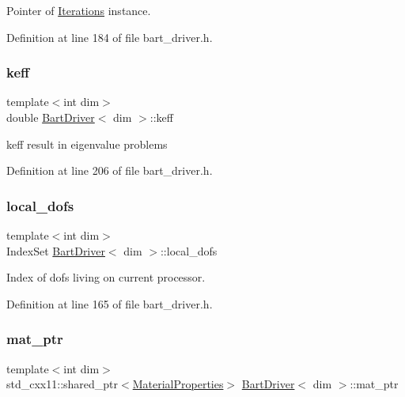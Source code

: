 Pointer of \hyperlink{class_iterations}{Iterations} instance. 



Definition at line 184 of file bart\+\_\+driver.\+h.

\mbox{\label{class_bart_driver_a459fab858171aa05e4618d6d9d327e87}} 
\subsubsection{\texorpdfstring{keff}{keff}}
{\footnotesize\ttfamily template$<$int dim$>$ \\
double \hyperlink{class_bart_driver}{Bart\+Driver}$<$ dim $>$\+::keff\hspace{0.3cm}{\ttfamily [private]}}



keff result in eigenvalue problems 



Definition at line 206 of file bart\+\_\+driver.\+h.

\mbox{\label{class_bart_driver_a06a4f83c6f9bea928ec311fcdf974ab1}} 
\subsubsection{\texorpdfstring{local\+\_\+dofs}{local\_dofs}}
{\footnotesize\ttfamily template$<$int dim$>$ \\
Index\+Set \hyperlink{class_bart_driver}{Bart\+Driver}$<$ dim $>$\+::local\+\_\+dofs\hspace{0.3cm}{\ttfamily [private]}}



Index of dofs living on current processor. 



Definition at line 165 of file bart\+\_\+driver.\+h.

\mbox{\label{class_bart_driver_aef9abac579c212463a6790a0e39e6429}} 
\subsubsection{\texorpdfstring{mat\+\_\+ptr}{mat\_ptr}}
{\footnotesize\ttfamily template$<$int dim$>$ \\
std\+\_\+cxx11\+::shared\+\_\+ptr$<$\hyperlink{class_material_properties}{Material\+Properties}$>$ \hyperlink{class_bart_driver}{Bart\+Driver}$<$ dim $>$\+::mat\+\_\+ptr\hspace{0.3cm}{\ttfamily [private]}}



